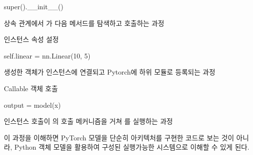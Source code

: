 \begin{dhkcode}
super().__init__()
\end{dhkcode}

상속 관계에서 가 다음 메서드를 탐색하고 호출하는 과정

\begin{dhknote}
\begin{dhksmry}[centered]
인스턴스 속성 설정
\end{dhksmry}
\end{dhknote}

\begin{dhkcode}
self.linear = nn.Linear(10, 5)
\end{dhkcode}

생성한 객체가 인스턴스에 연결되고 Pytorch에 하위 모듈로 등록되는 과정

\begin{dhknote}
\begin{dhksmry}[centered]
Callable 객체 호출
\end{dhksmry}
\end{dhknote}

\begin{dhkcode}
output = model(x)
\end{dhkcode}

인스턴스 호출이 의 호출 메커니즘을 거쳐 를 실행하는 과정

이 과정을 이해하면 PyTorch 모델을 단순히 아키텍처를 구현한 코드로 보는 것이 아니라, Python 객체 모델을 활용하여 구성된 실행가능한 시스템으로 이해할 수 있게 된다.
